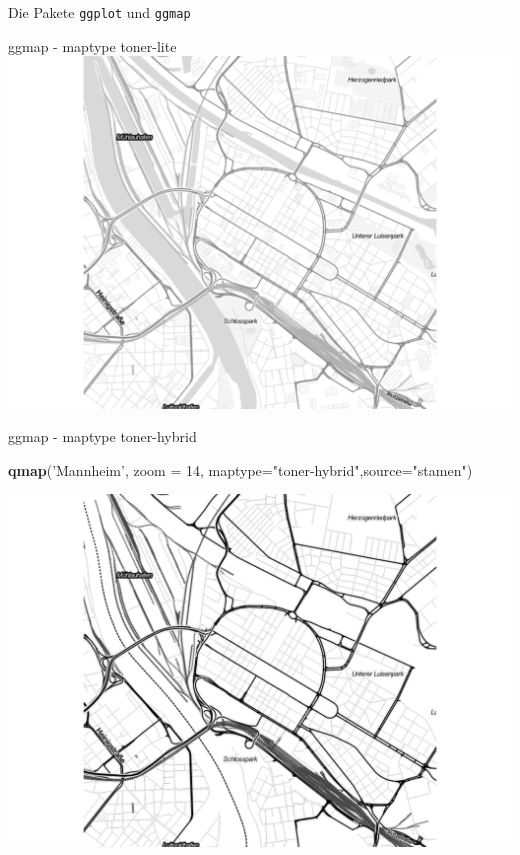 \documentclass[ignorenonframetext,]{beamer}
\newenvironment{Shaded}{}{}
\newcommand{\KeywordTok}[1]{\textcolor[rgb]{0.00,0.44,0.13}{\textbf{{#1}}}}
\newcommand{\DataTypeTok}[1]{\textcolor[rgb]{0.56,0.13,0.00}{{#1}}}
\newcommand{\DecValTok}[1]{\textcolor[rgb]{0.25,0.63,0.44}{{#1}}}
\newcommand{\StringTok}[1]{\textcolor[rgb]{0.25,0.44,0.63}{{#1}}}
\newcommand{\NormalTok}[1]{{#1}}
\begin{document}
\begin{frame}[fragile]{Die Pakete \texttt{ggplot} und \texttt{ggmap}}
\begin{block}{ggmap - maptype toner-lite}
\includegraphics{R_intern_files/figure-beamer/unnamed-chunk-268-1.pdf}

\end{block}

\begin{block}{ggmap - maptype toner-hybrid}

\begin{Shaded}
\begin{Highlighting}[]
\KeywordTok{qmap}\NormalTok{(}\StringTok{'Mannheim'}\NormalTok{, }\DataTypeTok{zoom =} \DecValTok{14}\NormalTok{,}
 \DataTypeTok{maptype=}\StringTok{"toner-hybrid"}\NormalTok{,}\DataTypeTok{source=}\StringTok{"stamen"}\NormalTok{)}
\end{Highlighting}
\end{Shaded}

\includegraphics{R_intern_files/figure-beamer/unnamed-chunk-269-1.pdf}


\end{block}
\end{frame}
\end{document}
